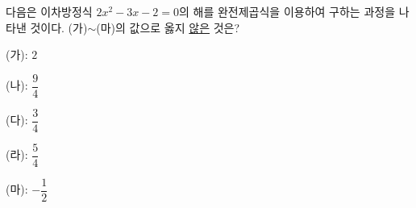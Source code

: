 다음은 이차방정식 $2x^2-3x-2=0$의 해를 완전제곱식을 이용하여 구하는 과정을 나타낸 것이다. (가)$\sim$(마)의 값으로 옳지 \underline{않은} 것은?
\begin{choices32}{\rule[-3ex]{0pt}{8ex}(가): $2$}{\rule[-3ex]{0pt}{8ex}(나): $\dfrac{9}{4}$}{\rule[-3ex]{0pt}{8ex}(다): $\dfrac{3}{4}$}{\rule[-3ex]{0pt}{8ex}(라): $\dfrac{5}{4}$}{\rule[-3ex]{0pt}{8ex}(마): $-\dfrac{1}{2}$}\end{choices32}
